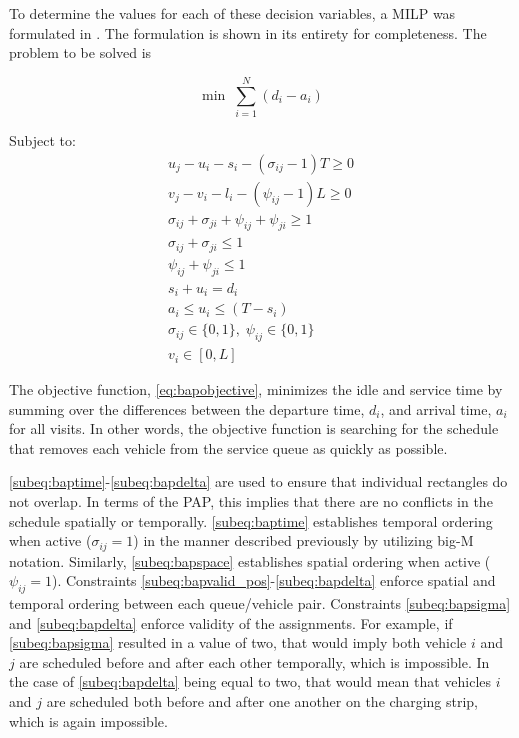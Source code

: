 \documentclass[ee,thesis]{usuthesis}
\begin{document}
To determine the values for each of these decision variables, a MILP was formulated in
\cite{qarebagh-2019-optim-sched}. The formulation is shown in its entirety for completeness.
The problem to be solved is

\begin{equation}
	\label{eq:bapobjective}
	\min\; \sum_{i=1}^N (d_i - a_i)
\end{equation}

Subject to:
\begin{subequations}
\label{eq:bapconstrs}
\begin{align}
    u_j - u_i - s_i - (\sigma_{ij} - 1)T \geq 0   \label{subeq:baptime}          \\
    v_j - v_i - l_i - (\psi_{ij} - 1)L \geq 0   \label{subeq:bapspace}           \\
    \sigma_{ij} + \sigma_{ji} + \psi_{ij} + \psi_{ji} \geq 1 \label{subeq:bapvalid_pos}     \\
    \sigma_{ij} + \sigma_{ji} \leq 1                   \label{subeq:bapsigma}        \\
    \psi_{ij} + \psi_{ji} \leq 1                   \label{subeq:bapdelta}        \\
    s_i + u_i = d_i                       \label{subeq:bapdetach}       \\
    a_i \leq u_i \leq (T - s_i)                 \label{subeq:bapvalid_starts} \\
    \sigma_{ij} \in \{0,1\},\;\psi_{ij} \in \{0,1\}\; \label{subeq:bapsdspace}      \\
    v_i \in [0, L ]                         \label{subeq:bapvspace}
\end{align}
\end{subequations}

\noindent The objective function, \autoref{eq:bapobjective}, minimizes the idle and service time by summing over the
differences between the departure time, \(d_i\), and arrival time, \(a_i\) for all visits. In other words, the objective
function is searching for the schedule that removes each vehicle from the service queue as quickly as possible.

\autoref{subeq:baptime}-\autoref{subeq:bapdelta} are used to ensure that individual rectangles do not overlap. In terms
of the PAP, this implies that there are no conflicts in the schedule spatially or temporally. \autoref{subeq:baptime}
establishes temporal ordering when active (\(\sigma_{ij}=1\)) in the manner described previously by utilizing big-M notation.
Similarly, \autoref{subeq:bapspace} establishes spatial ordering when active (\(\psi_{ij} =1\)). Constraints
\autoref{subeq:bapvalid_pos}-\autoref{subeq:bapdelta} enforce spatial and temporal ordering between each queue/vehicle
pair. Constraints \autoref{subeq:bapsigma} and \autoref{subeq:bapdelta} enforce validity of the assignments. For
example, if \autoref{subeq:bapsigma} resulted in a value of two, that would imply both vehicle \(i\) and \(j\) are scheduled
before and after each other temporally, which is impossible. In the case of \autoref{subeq:bapdelta} being equal to
two, that would mean that vehicles \(i\) and \(j\) are scheduled both before and after one another on the charging strip,
which is again impossible.
\end{document}
